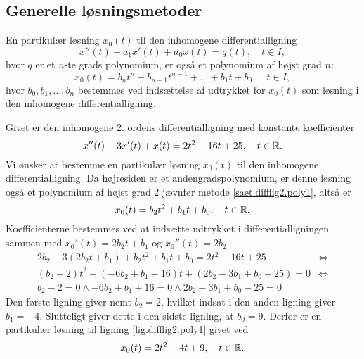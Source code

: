 \subsection{Generelle løsningsmetoder}

\begin{method}[Polynomium] \label{saet.difflig2.poly1}
En partikulær løsning $ x_0(t) $ til den inhomogene differentialligning
\begin{equation}
x''(t) + a_1x'(t) + a_0x(t) = q(t), \quad t \in I,
\end{equation}
hvor $ q $ er et $ n $-te grads polynomium, er også et polynomium af højst grad $ n $:
\begin{equation}
x_0(t) = b_n t^n + b_{n-1} t^{n-1} + \ldots + b_1 t + b_0, \quad t \in I,
\end{equation}
hvor $ b_0,b_1,\ldots,b_n $ bestemmes ved indsættelse af udtrykket for $ x_0(t) $ som løsning i den inhomogene differentialligning.
\end{method}

\begin{example}[Polynomium] \label{eks.difflig2.poly1}
Givet er den inhomogene 2. ordens differentialligning med konstante koefficienter
\begin{equation}
x''(t) - 3x'(t) + x(t) = 2t^2 - 16t + 25, \quad t \in \mathbb{R}. \label{lig.difflig2.poly1}
\end{equation}
Vi ønsker at bestemme en partikulær løsning $ x_0(t) $ til den inhomogene differentialligning. Da højresiden er et andengradspolynomium, er denne løsning også et polynomium af højst grad 2 jævnfør metode \ref{saet.difflig2.poly1}, altså er
\begin{equation}
x_0(t) = b_2t^2 + b_1t + b_0, \quad t \in \mathbb{R}.
\end{equation}
Koefficienterne bestemmes ved at indsætte udtrykket i differentialligningen sammen med $ x_0'(t) = 2b_2t + b_1 $ og $ x_0''(t) = 2b_2 $.
\begin{equation}
\begin{aligned}
2b_2 - 3(2b_2t + b_1) + b_2t^2 + b_1t + b_0 = 2t^2 - 16t + 25 & \Leftrightarrow \\
(b_2 - 2)t^2 + (-6b_2 + b_1 + 16)t + (2b_2 - 3b_1 + b_0 - 25) = 0 & \Leftrightarrow \\
b_2 - 2 = 0 \wedge -6b_2 + b_1 + 16 = 0 \wedge 2b_2 - 3b_1 + b_0 - 25 = 0 &
\end{aligned}
\end{equation}
Den første ligning giver nemt $ b_2 = 2 $, hvilket indsat i den anden ligning giver $ b_1 = -4 $. Slutteligt giver dette i den sidste ligning, at $ b_0 = 9 $. Derfor er en partikulær løsning til ligning \eqref{lig.difflig2.poly1} givet ved
\begin{equation}
x_0(t) = 2t^2 - 4t + 9, \quad t \in \mathbb{R}.
\end{equation}
\end{example}

